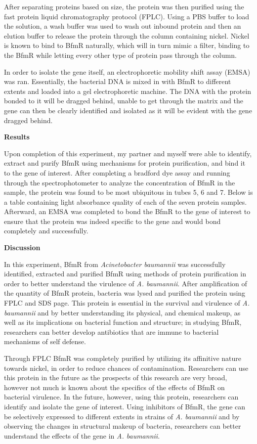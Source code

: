 \documentclass[11pt]{article}
\begin{document}
After separating proteins based on size, the protein was then purified using the fast protein liquid chromatography protocol (FPLC). Using a PBS buffer to load the solution, a wash buffer was used to wash out inbound protein and then an elution buffer to release the protein through the column containing nickel. Nickel is known to bind to BfmR naturally, which will in turn mimic a filter, binding to the BfmR while letting every other type of protein pass through the column.

In order to isolate the gene itself, an electrophoretic mobility shift assay (EMSA) was ran. Essentially, the bacterial DNA is mixed in with BfmR to different extents and loaded into a gel electrophoretic machine. The DNA with the protein bonded to it will be dragged behind, unable to get through the matrix and the gene can then be clearly identified and isolated as it will be evident with the gene dragged behind.

{\bf Results}

Upon completion of this experiment, my partner and myself were able to identify, extract and purify BfmR using mechanisms for protein purification, and bind it to the gene of interest. After completing a bradford dye assay and running through the spectrophotometer to analyze the concentration of BfmR in the sample, the protein was found to be most ubiquitous in tubes 5, 6 and 7. Below is a table containing light absorbance quality of each of the seven protein samples. Afterward, an EMSA was completed to bond the BfmR to the gene of interest to ensure that the protein was indeed specific to the gene and would bond completely and successfully. 

{\bf Discussion}

In this experiment, BfmR from \emph{Acinetobacter baumannii} was successfully identified, extracted and purified BfmR using methods of protein purification in order to better understand the virulence of \emph{A. baumannii}. After amplification of the quantity of BfmR protein, bacteria was lysed and purified the protein using FPLC and SDS page. This protein is essential in the survival and virulence of \emph{A. baumannii} and by better understanding its physical, and chemical makeup, as well as its implications on bacterial function and structure; in studying BfmR, researchers can better develop antibiotics that are immune to bacterial mechanisms of self defense.

Through FPLC BfmR was completely purified by utilizing its affinitive nature towards nickel, in order to reduce chances of contamination. Researchers can use this protein in the future as the prospects of this research are very broad, however not much is known about the specifics of the effects of BfmR on bacterial virulence. In the future, however, using this protein, researchers can identify and isolate the gene of interest. Using inhibitors of BfmR, the gene can be selectively expressed to different extents in strains of \emph{A. baumannii} and by observing the changes in structural makeup of bacteria, researchers can better understand the effects of the gene in \emph{A. baumannii}.
\end{document}
